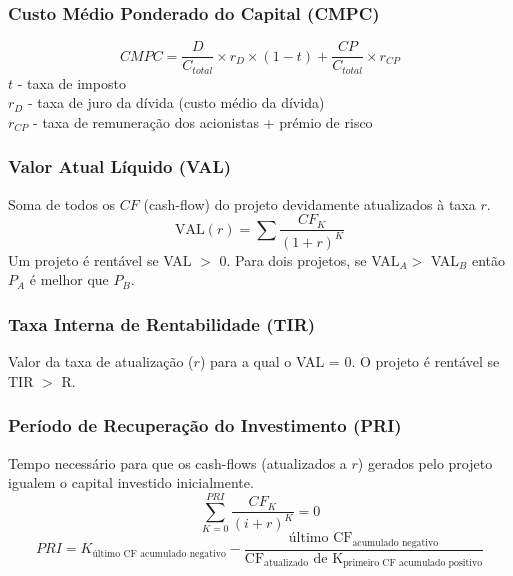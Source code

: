 \documentclass[11pt]{article}
\begin{document}
\subsubsection{Custo Médio Ponderado do Capital (CMPC)}

\begin{equation*}
    CMPC =
    \frac{D}{C_{total}}\times r_D\times(1-t)+\frac{CP}{C_{total}}\times r_{CP}
\end{equation*}
$t$ - taxa de imposto \\
$r_D$ - taxa de juro da dívida (custo médio da dívida) \\
$r_{CP}$ - taxa de remuneração dos acionistas + prémio de risco

\subsubsection{Valor Atual Líquido (VAL)}

Soma de todos os $CF$ (cash-flow) do projeto devidamente atualizados à taxa $r$.
\begin{equation*}
    \text{VAL}(r) = \sum \frac{CF_K}{(1+r)^K}
\end{equation*}
Um projeto é rentável se VAL $>$ 0.
Para dois projetos, se VAL$_A >$ VAL$_B$ então $P_A$ é melhor que $P_B$.

\subsubsection{Taxa Interna de Rentabilidade (TIR)}

Valor da taxa de atualização ($r$) para a qual o VAL = 0. O projeto é rentável se TIR $>$ R.

\subsubsection{Período de Recuperação do Investimento (PRI)}

Tempo necessário para que os cash-flows (atualizados a $r$) gerados pelo projeto igualem o capital investido inicialmente.
\begin{equation*}
    \sum_{K=0}^{PRI} \frac{CF_K}{(i+r)^K}=0
\end{equation*}
\begin{equation*}
    PRI = K_{\text{último CF acumulado negativo}} - \frac{\text{último CF}_{\text{acumulado negativo}}}{\text{CF}_{\text{atualizado}}\text{ de K}_{\text{primeiro CF acumulado positivo}}}
\end{equation*}
\end{document}
